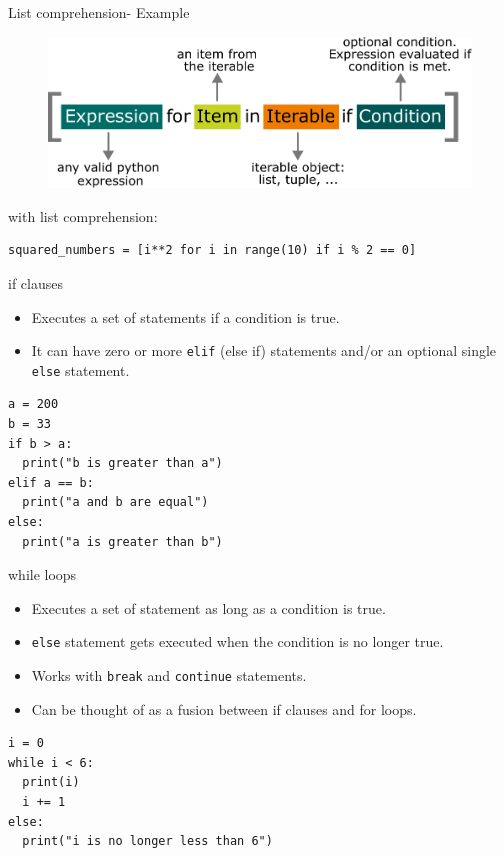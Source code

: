\documentclass[compress%
,aspectratio=169%
]{beamer}
\newcommand{\code}{\lstinline}
\begin{document}
\begin{frame}[fragile]{List comprehension- Example}
\begin{figure}
    \centering
    \includegraphics[width=0.6\linewidth]{img/list_comprehension.pdf}
\end{figure}

with list comprehension:
\begin{lstlisting}
squared_numbers = [i**2 for i in range(10) if i % 2 == 0]
\end{lstlisting}
\end{frame}


\begin{frame}[fragile]{if clauses}
\begin{itemize}
    \item Executes a set of statements if a condition is true.
    \item It can have zero or more \code|elif| (else if) statements and/or an optional single \code|else| statement.
\end{itemize}

\begin{lstlisting}
a = 200
b = 33
if b > a:
  print("b is greater than a")
elif a == b:
  print("a and b are equal")
else:
  print("a is greater than b")
\end{lstlisting}
\end{frame}




\begin{frame}[fragile]{while loops}
\begin{itemize}
    \item Executes a set of statement as long as a condition is true.
    \item \code|else| statement gets executed when the condition is no longer true.
    \item Works with \code|break| and \code|continue| statements.
    \item Can be thought of as a fusion between if clauses and for loops.
\end{itemize}
\begin{lstlisting}
i = 0
while i < 6:
  print(i)
  i += 1
else:
  print("i is no longer less than 6")
\end{lstlisting}
\end{frame}
\end{document}
